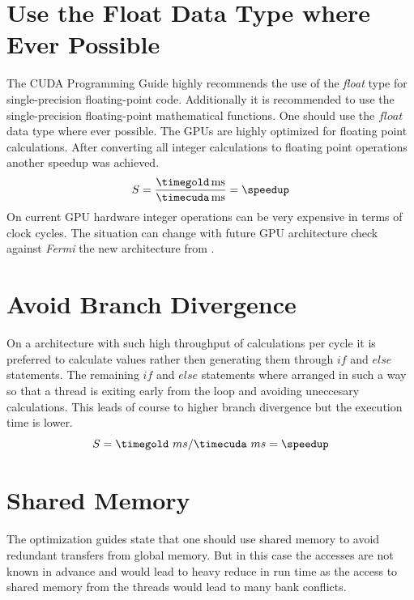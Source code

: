 
\section{Use the Float Data Type where Ever Possible}
The \gls{CUDA} Programming Guide \citep{citeulike:3325943} highly recommends the
use of the \emph{float} type for single-precision floating-point code.
Additionally it is recommended to use the single-precision floating-point
mathematical functions. One should use the $float$ data type where ever
possible. The \glspl{GPU} are highly optimized for floating point calculations.
After converting all integer calculations to floating point operations another
speedup was achieved.
\fpDiv{\speedup}{\timegold}{\timecuda}
\begin{equation*}\label{eq:speedup5}
	S = \frac{\unit[\timegold]{ms}}{\unit[\timecuda]{ms}} = \speedup
\end{equation*}
On current \gls{GPU} hardware integer operations can be very expensive in terms
of clock cycles. The situation can change with future \gls{GPU} architecture check
against \emph{Fermi} the new architecture from {} 
{}.



\section{Avoid Branch Divergence} %
\label{sec:avoid_branch_divergence}
On a architecture with such high throughput of calculations per cycle it is preferred
to calculate values rather then generating them through $if$ and $else$ statements.
The remaining $if$ and $else$ statements where arranged in such a way so that a 
thread is exiting early from the loop and avoiding uneccesary calculations. This leads
of course to higher branch divergence but the execution time is lower. 
\fpDiv{\speedup}{\timegold}{\timecuda}
\begin{equation*}\label{eq:speedup6}
	S = \timegold\ ms/\timecuda\ ms = \speedup
\end{equation*}

\section{Shared Memory} %
\label{sec:shared_memory}
The optimization guides state that one should use shared memory to avoid 
redundant transfers from global memory. But in this case the accesses are not 
known in advance and would lead to heavy reduce in run time as the access to 
shared memory from the threads would lead to many bank conflicts. 

